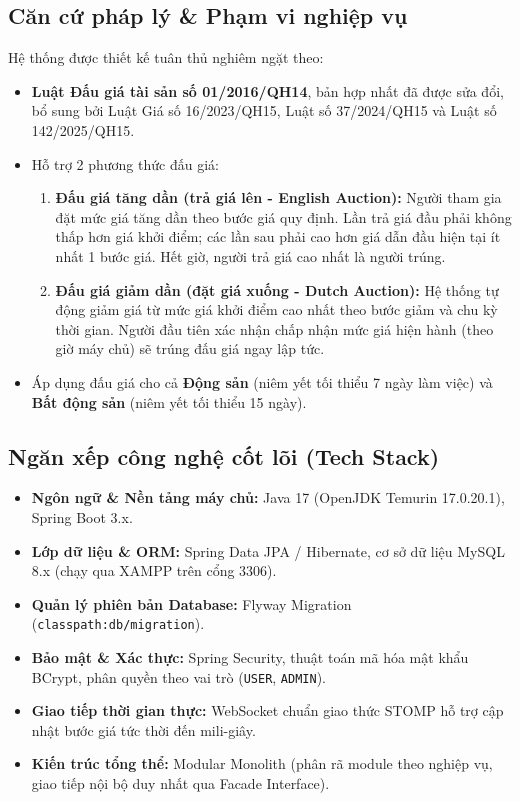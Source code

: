 \documentclass[a4paper]{article}
\begin{document}
\subsection{Căn cứ pháp lý \& Phạm vi nghiệp vụ}
Hệ thống được thiết kế tuân thủ nghiêm ngặt theo:
\begin{itemize}
    \item \textbf{Luật Đấu giá tài sản số 01/2016/QH14}, bản hợp nhất đã được sửa đổi, bổ sung bởi Luật Giá số 16/2023/QH15, Luật số 37/2024/QH15 và Luật số 142/2025/QH15.
    \item Hỗ trợ 2 phương thức đấu giá:
    \begin{enumerate}
        \item \textbf{Đấu giá tăng dần (trả giá lên - English Auction):} Người tham gia đặt mức giá tăng dần theo bước giá quy định. Lần trả giá đầu phải không thấp hơn giá khởi điểm; các lần sau phải cao hơn giá dẫn đầu hiện tại ít nhất 1 bước giá. Hết giờ, người trả giá cao nhất là người trúng.
        \item \textbf{Đấu giá giảm dần (đặt giá xuống - Dutch Auction):} Hệ thống tự động giảm giá từ mức giá khởi điểm cao nhất theo bước giảm và chu kỳ thời gian. Người đầu tiên xác nhận chấp nhận mức giá hiện hành (theo giờ máy chủ) sẽ trúng đấu giá ngay lập tức.
    \end{enumerate}
    \item Áp dụng đấu giá cho cả \textbf{Động sản} (niêm yết tối thiểu 7 ngày làm việc) và \textbf{Bất động sản} (niêm yết tối thiểu 15 ngày).
\end{itemize}

\subsection{Ngăn xếp công nghệ cốt lõi (Tech Stack)}
\begin{itemize}
    \item \textbf{Ngôn ngữ \& Nền tảng máy chủ:} Java 17 (OpenJDK Temurin 17.0.20.1), Spring Boot 3.x.
    \item \textbf{Lớp dữ liệu \& ORM:} Spring Data JPA / Hibernate, cơ sở dữ liệu MySQL 8.x (chạy qua XAMPP trên cổng 3306).
    \item \textbf{Quản lý phiên bản Database:} Flyway Migration (\texttt{classpath:db/migration}).
    \item \textbf{Bảo mật \& Xác thực:} Spring Security, thuật toán mã hóa mật khẩu BCrypt, phân quyền theo vai trò (\texttt{USER}, \texttt{ADMIN}).
    \item \textbf{Giao tiếp thời gian thực:} WebSocket chuẩn giao thức STOMP hỗ trợ cập nhật bước giá tức thời đến mili-giây.
    \item \textbf{Kiến trúc tổng thể:} Modular Monolith (phân rã module theo nghiệp vụ, giao tiếp nội bộ duy nhất qua Facade Interface).
\end{itemize}
\end{document}
